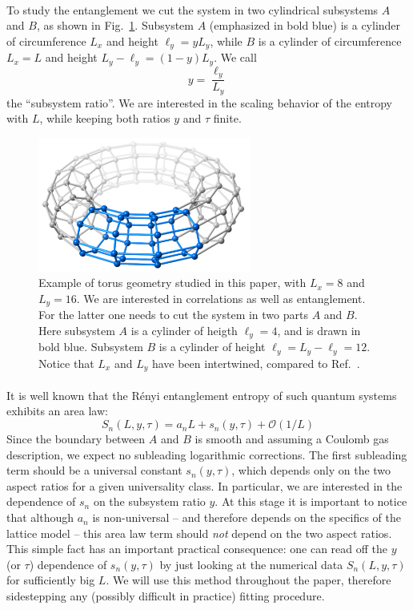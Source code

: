 \documentclass[11pt]{iopart}
\begin{document}
\paragraph{}
To study the entanglement we cut the system in two cylindrical subsystems $A$ and $B$, as shown in Fig.~\ref{fig:torus}. Subsystem $A$ (emphasized in bold blue) is a cylinder of circumference $L_x$ and height $\ell_y=y L_y$, while $B$ is a cylinder of circumference $L_x=L$ and height $L_y-\ell_y=(1-y)L_y$. We call
\begin{equation}
 y=\frac{\ell_y}{L_y}
\end{equation}
the ``subsystem ratio''. 
We are interested in the scaling behavior of the entropy with $L$, while keeping both ratios $y$ and $\tau$ finite. 
\begin{figure}[ht]
 \begin{center}
  \includegraphics[width=7cm,angle=-90]{./figures/16x8b.pdf}
  \end{center}
  \caption{Example of torus geometry studied in this paper, with $L_x=8$ and $L_y=16$. We are interested in correlations as well as entanglement. For the latter one needs to cut the system in two parts $A$ and $B$. Here subsystem $A$ is a cylinder of heigth $\ell_y=4$, and is drawn in bold blue. Subsystem $B$ is a cylinder of height $\ell_y=L_y-\ell_y=12$. Notice that $L_x$ and $L_y$ have been intertwined, compared to Ref.~\cite{Ju2012}.}
\label{fig:torus}
 \end{figure}
\paragraph{}
 It is well known that the R\'enyi entanglement entropy of such quantum systems exhibits an area law\cite{ALreview}:
\begin{equation}
 S_n(L,y,\tau)= a_{n} L+s_{n}(y,\tau)+\mathcal{O}(1/L)
\end{equation}
Since the boundary between $A$ and $B$ is smooth and assuming a Coulomb gas description, we expect no subleading logarithmic corrections\cite{Hsu09}. The first subleading term should be a universal constant $s_n(y,\tau)$, which depends only on the two aspect ratios for a given universality class. In particular, we are interested in the dependence of $s_n$ on the subsystem ratio $y$. At this stage it is important to notice that although $a_n$ is non-universal -- and therefore depends on the specifics of the lattice model -- this area law term should \emph{not} depend on the two aspect ratios. This simple fact has an important practical consequence: one can read off the $y$ (or $\tau$) dependence of $s_n(y,\tau)$ by just looking at the numerical data $S_n(L,y,\tau)$ for sufficiently big $L$. We will use this method throughout the paper, therefore sidestepping any  (possibly difficult in practice) fitting procedure.    
\end{document}

